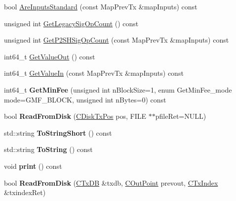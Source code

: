 \begin{DoxyCompactItemize}
\item 
bool \mbox{\hyperlink{class_c_transaction_a48850ab313a08578c7cf91715eec1730}{Are\+Inputs\+Standard}} (const Map\+Prev\+Tx \&map\+Inputs) const
\item 
unsigned int \mbox{\hyperlink{class_c_transaction_aba5dcae9888d51ab2f7c57f833cd2d22}{Get\+Legacy\+Sig\+Op\+Count}} () const
\item 
unsigned int \mbox{\hyperlink{class_c_transaction_a39eafe87dc398013919747fb8514611b}{Get\+P2\+S\+H\+Sig\+Op\+Count}} (const Map\+Prev\+Tx \&map\+Inputs) const
\item 
int64\+\_\+t \mbox{\hyperlink{class_c_transaction_a9ce7d94c68adb37627d82669b83a7c59}{Get\+Value\+Out}} () const
\item 
int64\+\_\+t \mbox{\hyperlink{class_c_transaction_a50051cce0d44bc4ea2018625101dc1b6}{Get\+Value\+In}} (const Map\+Prev\+Tx \&map\+Inputs) const
\item 
\mbox{\label{class_c_transaction_a304be7b026a1e691f09b18f5c63eb911}} 
int64\+\_\+t {\bfseries Get\+Min\+Fee} (unsigned int n\+Block\+Size=1, enum Get\+Min\+Fee\+\_\+mode mode=G\+M\+F\+\_\+\+B\+L\+O\+CK, unsigned int n\+Bytes=0) const
\item 
\mbox{\label{class_c_transaction_ad9d526afecbd816c385343f60c5352fd}} 
bool {\bfseries Read\+From\+Disk} (\mbox{\hyperlink{class_c_disk_tx_pos}{C\+Disk\+Tx\+Pos}} pos, F\+I\+LE $\ast$$\ast$pfile\+Ret=N\+U\+LL)
\item 
\mbox{\label{class_c_transaction_a53846182baa027693de50a0290073844}} 
std\+::string {\bfseries To\+String\+Short} () const
\item 
\mbox{\label{class_c_transaction_a80370923c3ac828de68919295d5d0659}} 
std\+::string {\bfseries To\+String} () const
\item 
\mbox{\label{class_c_transaction_a2cfc063a055981ba39f83065eee3b5a2}} 
void {\bfseries print} () const
\item 
\mbox{\label{class_c_transaction_acb9a99f02a15ad1ae12cc2692632dd66}} 
bool {\bfseries Read\+From\+Disk} (\mbox{\hyperlink{class_c_tx_d_b}{C\+Tx\+DB}} \&txdb, \mbox{\hyperlink{class_c_out_point}{C\+Out\+Point}} prevout, \mbox{\hyperlink{class_c_tx_index}{C\+Tx\+Index}} \&txindex\+Ret)
$$
\end{DoxyCompactItemize}
